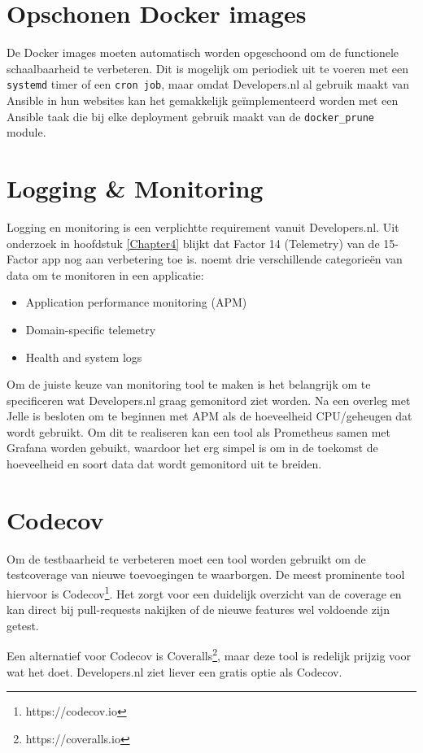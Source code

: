 \section{Opschonen Docker images}
De Docker images moeten automatisch worden opgeschoond om de functionele schaalbaarheid te verbeteren. Dit is mogelijk om periodiek uit te voeren met een \texttt{systemd} timer of een \texttt{cron job}, maar omdat Developers.nl al gebruik maakt van Ansible in hun websites kan het gemakkelijk geïmplementeerd worden met een Ansible taak die bij elke deployment gebruik maakt van de \texttt{docker\_prune} module.

\section{Logging \& Monitoring}
Logging en monitoring is een verplichtte requirement vanuit Developers.nl. Uit onderzoek in hoofdstuk \ref{Chapter4} blijkt dat Factor 14 (Telemetry) van de 15-Factor app nog aan verbetering toe is. \parencite{Beyond12Factor} noemt drie verschillende categorieën van data om te monitoren in een applicatie:
\begin{itemize}
	\item Application performance monitoring (APM)
	\item Domain-specific telemetry
	\item Health and system logs
\end{itemize}

Om de juiste keuze van monitoring tool te maken is het belangrijk om te specificeren wat Developers.nl graag gemonitord ziet worden. Na een overleg met Jelle is besloten om te beginnen met APM als de hoeveelheid CPU/geheugen dat wordt gebruikt. Om dit te realiseren kan een tool als Prometheus samen met Grafana worden gebuikt, waardoor het erg simpel is om in de toekomst de hoeveelheid en soort data dat wordt gemonitord uit te breiden.

\section{Codecov}
Om de testbaarheid te verbeteren moet een tool worden gebruikt om de testcoverage van nieuwe toevoegingen te waarborgen. De meest prominente tool hiervoor is Codecov\footnote{https://codecov.io}. Het zorgt voor een duidelijk overzicht van de coverage en kan direct bij pull-requests nakijken of de nieuwe features wel voldoende zijn getest.

Een alternatief voor Codecov is Coveralls\footnote{https://coveralls.io}, maar deze tool is redelijk prijzig voor wat het doet. Developers.nl ziet liever een gratis optie als Codecov.

